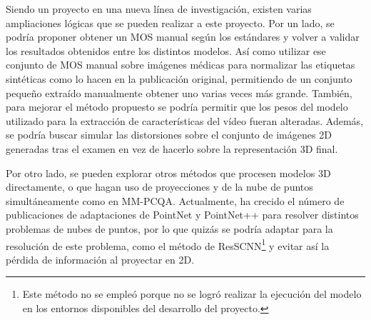 Siendo un proyecto en una nueva línea de investigación, existen varias ampliaciones 
lógicas que se pueden realizar a este proyecto. Por un lado, se podría proponer 
obtener un MOS manual según los estándares y volver a validar los resultados obtenidos
entre los distintos modelos. Así como utilizar ese conjunto de MOS manual sobre imágenes médicas 
para normalizar las etiquetas sintéticas como lo hacen en la publicación original, 
permitiendo de un conjunto pequeño extraído manualmente obtener uno varias 
veces más grande. También, para mejorar el método propuesto se podría permitir 
que los pesos del modelo utilizado para la extracción de características 
del vídeo fueran alteradas. Además, se podría buscar simular las distorsiones 
sobre el conjunto de imágenes 2D generadas tras el examen en vez de hacerlo 
sobre la representación 3D final. 

Por otro lado, se pueden explorar otros métodos que procesen modelos 3D directamente, 
o que hagan uso de proyecciones y de la nube de puntos simultáneamente como en MM-PCQA\cite{MM-PCQA}.
Actualmente, ha crecido el número de publicaciones de adaptaciones de PointNet\cite{PointNet} y 
PointNet++\cite{PointNet++} para resolver distintos problemas de nubes de puntos, 
por lo que quizás se podría adaptar para la resolución de este problema, como 
el método de ResSCNN\cite{ResSCNN}\footnote{Este método no se empleó porque no se 
logró realizar la ejecución del modelo en los entornos disponibles 
del desarrollo del proyecto.} y evitar así 
la pérdida de información al proyectar en 2D.

